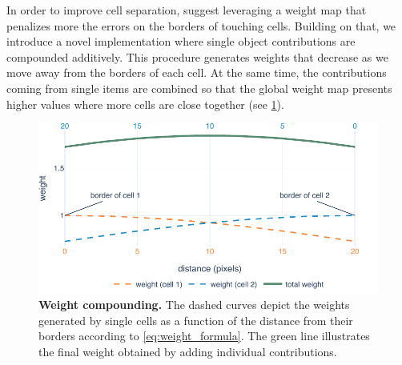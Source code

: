 In order to improve cell separation,  suggest leveraging a weight map that penalizes more the errors on the borders of touching cells.
Building on that, we introduce a novel implementation where single object contributions are compounded additively.
This procedure generates weights that decrease as we move away from the borders of each cell.
At the same time, the contributions coming from single items are combined so that the global weight map presents higher values where more cells are close together (see \cref{fig:weight_calculation}).
%
%
\begin{figure}
    \centering
    \includegraphics[width=\textwidth]{figures/130_methods/weights_calculation.pdf}
    \caption{\textbf{Weight compounding.}
    The dashed curves depict the weights generated by single cells as a function of the distance from their borders according to \cref{eq:weight_formula}.
    The green line illustrates the final weight obtained by adding individual contributions.}
    \label{fig:weight_calculation}
\end{figure}
